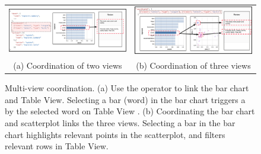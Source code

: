 \begin{figure}[tbp]
\centering
\small
\begin{tabular}{ c c}
  \includegraphics[width=0.5\linewidth,height=0.18\linewidth]{figures/unidirect_bar_table.pdf}   & 
  \includegraphics[width=0.5\linewidth,height=0.18\linewidth]{figures/unidirect_bar_table_scatter.pdf} \\
     (a) Coordination of two views & 
     (b) Coordination of three views 
\end{tabular}
    \caption{\small Multi-view coordination. (a) Use the  operator to link the bar chart and Table View. Selecting a bar (word) in the bar chart triggers a  by the selected word on Table View . (b) Coordinating the bar chart and scatterplot links the three views. Selecting a bar in the bar chart highlights relevant points in the scatterplot, and filters relevant rows in Table View.}
    \label{fig:use-case-b}
    \vspace{-15pt}
\end{figure}


